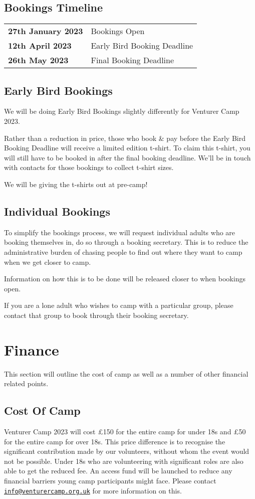 \documentclass[a4paper, 10pt]{report}
\begin{document}
\section{Bookings Timeline}
\begin{table}[H]
    \centering
\begin{tabularx}{\textwidth}{ll}
    \textbf{27th January 2023} & Bookings Open \\
    \textbf{12th April 2023} & Early Bird Booking Deadline \\
    \textbf{26th May 2023} & Final Booking Deadline
\end{tabularx}
\end{table}
\section{Early Bird Bookings}
We will be doing Early Bird Bookings slightly differently for Venturer Camp 2023.

Rather than a reduction in price, those who book \& pay before the Early Bird Booking Deadline will receive a limited edition t-shirt. To claim this t-shirt, you will still have to be booked in after the final booking deadline. We'll be in touch with contacts for those bookings to collect t-shirt sizes. 

We will be giving the t-shirts out at pre-camp!
\section{Individual Bookings}
To simplify the bookings process, we will request individual adults who are booking themselves in, do so through a booking secretary. This is to reduce the administrative burden of chasing people to find out where they want to camp when we get closer to camp.

Information on how this is to be done will be released closer to when bookings open.

If you are a lone adult who wishes to camp with a particular group, please contact that group to book through their booking secretary. 

\chapter{Finance}
This section will outline the cost of camp as well as a number of other financial related points.
\section{Cost Of Camp}
Venturer Camp 2023 will cost £150 for the entire camp for under 18s and £50 for the entire camp for over 18s. This price difference is to recognise the significant contribution made by our volunteers, without whom the event would not be possible. Under 18s who are volunteering with significant roles are also able to get the reduced fee. An access fund will be launched to reduce any financial barriers young camp participants might face. Please contact \href{mailto:info@venturercamp.org.uk}{\texttt{info@venturercamp.org.uk}} for more information on this.
\end{document}

